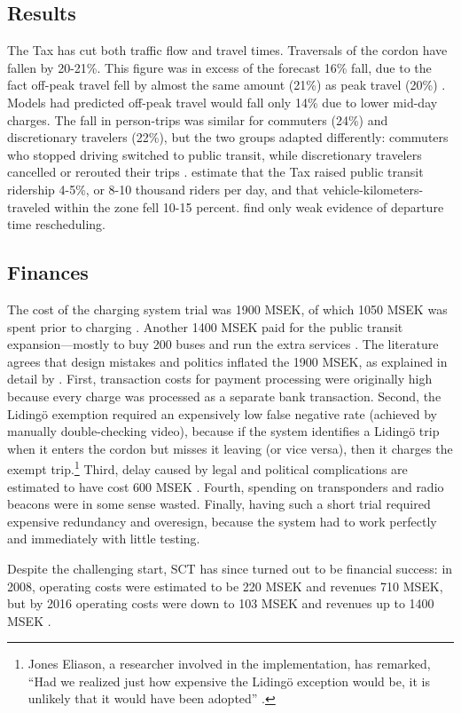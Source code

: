 \subsection{Results}

The Tax has cut both traffic flow and travel times. Traversals of the cordon have fallen by 20-21\%. This figure was in excess of the forecast 16\% fall, due to the fact off-peak travel fell by almost the same amount (21\%) as peak travel (20\%) \citep{Eliasson2013}. Models had predicted off-peak travel would fall only 14\% due to lower mid-day charges. The fall in person-trips was similar for commuters (24\%) and discretionary travelers (22\%), but the two groups adapted differently: commuters who stopped driving switched to public transit, while discretionary travelers cancelled or rerouted their trips \citep{FranklinEtAl2010}. \citet{Eliasson2013} estimate that the Tax raised public transit ridership 4-5\%, or 8-10 thousand riders per day, and that vehicle-kilometers-traveled within the zone fell 10-15 percent. \citet{Karlstrom2009} find only weak evidence of departure time rescheduling.

\subsection{Finances}

The cost of the charging system trial was 1900 MSEK, of which 1050 MSEK was spent prior to charging \citep{Eliasson2009}. Another 1400 MSEK paid for the public transit expansion---mostly to buy 200 buses and run the extra services \citep[p. 398]{Eliason2008}. The literature agrees that design mistakes and politics inflated the 1900 MSEK, as explained in detail by \citet{Hamilton2011}. First, transaction costs for payment processing were originally high because every charge was processed as a separate bank transaction. Second, the Liding\"o exemption required an expensively low false negative rate (achieved by manually double-checking video), because if the system identifies a Liding\"o trip when it enters the cordon but misses it leaving (or vice versa), then it charges the exempt trip.\footnote{Jones Eliason, a researcher involved in the implementation, has remarked, ``Had we realized just how expensive the Liding\"o exception would be, it is unlikely that it would have been adopted'' \citep[p. 217]{Eliasson2009b}.} Third, delay caused by legal and political complications are estimated to have cost 600 MSEK \citep[p. 121]{GullbergIsaksson2009}. Fourth, spending on transponders and radio beacons were in some sense wasted. Finally, having such a short trial required expensive redundancy and overesign, because the system had to work perfectly and immediately with little testing.

Despite the challenging start, SCT has since turned out to be financial success: in 2008, operating costs were estimated to be 220 MSEK and revenues 710 MSEK, but by 2016 operating costs were down to 103 MSEK and revenues up to 1400 MSEK \citep[p. 40]{Borjesson2018}. 
